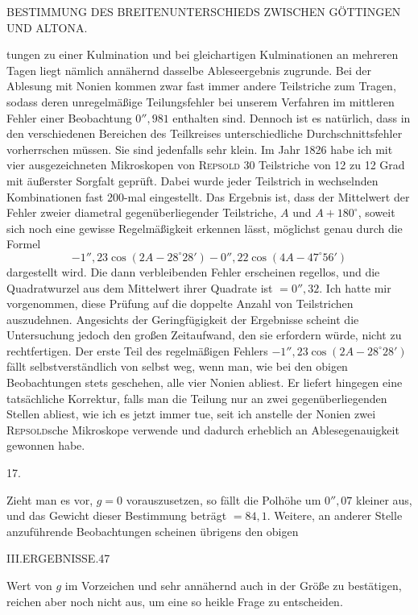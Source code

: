 \clearpage
\noindent{}\parbox[t]{\dimexpr\textwidth-10mm\relax}{\centering\scriptsize BESTIMMUNG DES BREITENUNTERSCHIEDS ZWISCHEN GÖTTINGEN UND ALTONA.}\par
\noindent tungen zu einer Kulmination und bei gleichartigen Kulminationen an mehreren Tagen liegt nämlich annähernd dasselbe Ableseergebnis zugrunde. Bei der Ablesung mit Nonien kommen zwar fast immer andere Teilstriche zum Tragen, sodass deren unregelmäßige Teilungsfehler bei unserem Verfahren im mittleren Fehler einer Beobachtung $0''{,}981$ enthalten sind. Dennoch ist es natürlich, dass in den verschiedenen Bereichen des Teilkreises unterschiedliche Durchschnittsfehler vorherrschen müssen. Sie sind jedenfalls sehr klein. Im Jahr 1826 habe ich mit vier ausgezeichneten Mikroskopen von \textsc{Repsold} 30 Teilstriche von 12 zu 12 Grad mit äußerster Sorgfalt geprüft. Dabei wurde jeder Teilstrich in wechselnden Kombinationen fast 200-mal eingestellt. Das Ergebnis ist, dass der Mittelwert der Fehler zweier diametral gegenüberliegender Teilstriche, $A$ und $A+180^\circ$, soweit sich noch eine gewisse Regelmäßigkeit erkennen lässt, möglichst genau durch die Formel
\[
-1''{,}23\cos(2A-28^\circ28')-0''{,}22\cos(4A-47^\circ56')
\]
dargestellt wird. Die dann verbleibenden Fehler erscheinen regellos, und die Quadratwurzel aus dem Mittelwert ihrer Quadrate ist $=0''{,}32$. Ich hatte mir vorgenommen, diese Prüfung auf die doppelte Anzahl von Teilstrichen auszudehnen. Angesichts der Geringfügigkeit der Ergebnisse scheint die Untersuchung jedoch den großen Zeitaufwand, den sie erfordern würde, nicht zu rechtfertigen. Der erste Teil des regelmäßigen Fehlers $-1''{,}23\cos(2A-28^\circ28')$ fällt selbstverständlich von selbst weg, wenn man, wie bei den obigen Beobachtungen stets geschehen, alle vier Nonien abliest. Er liefert hingegen eine tatsächliche Korrektur, falls man die Teilung nur an zwei gegenüberliegenden Stellen abliest, wie ich es jetzt immer tue, seit ich anstelle der Nonien zwei \textsc{Repsold}sche Mikroskope verwende und dadurch erheblich an Ablesegenauigkeit gewonnen habe.
\begin{center}17.\end{center}
Zieht man es vor, $g=0$ vorauszusetzen, so fällt die Polhöhe um $0''{,}07$ kleiner aus, und das Gewicht dieser Bestimmung beträgt $=84{,}1$. Weitere, an anderer Stelle anzuführende Beobachtungen scheinen übrigens den obigen

\clearpage
\noindent\mbox{}\hfill III.\quad ERGEBNISSE.\hfill 47\par
\noindent Wert von $g$ im Vorzeichen und sehr annähernd auch in der Größe zu bestätigen, reichen aber noch nicht aus, um eine so heikle Frage zu entscheiden.

